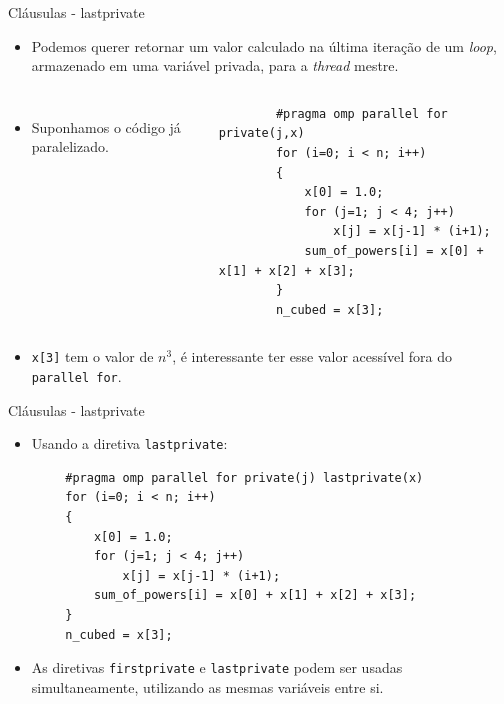 \begin{frame}[fragile]{Cláusulas - lastprivate}
	\begin{itemize}
		\item Podemos querer retornar um valor calculado na última iteração de um \textit{loop}, armazenado em uma variável privada, para a \textit{thread} mestre.
	\end{itemize}
	\begin{columns}
			\begin{itemize}
				\item Suponhamos o código já paralelizado.
			\end{itemize}
		\begin{verbatim}
		#pragma omp parallel for private(j,x)
		for (i=0; i < n; i++)
		{
			x[0] = 1.0;
			for (j=1; j < 4; j++)
				x[j] = x[j-1] * (i+1);
			sum_of_powers[i] = x[0] + x[1] + x[2] + x[3];
		}
		n_cubed = x[3];
		\end{verbatim}
	\end{columns}
	\begin{itemize}
		\item \texttt{x[3]} tem o valor de $n^3$, é interessante ter esse valor acessível fora do \texttt{parallel for}.
	\end{itemize}
\end{frame}

\begin{frame}[fragile]{Cláusulas - lastprivate}
	\begin{itemize}
		\item Usando a diretiva \texttt{lastprivate}:
	\end{itemize}
	\begin{verbatim}
		#pragma omp parallel for private(j) lastprivate(x)
		for (i=0; i < n; i++)
		{
			x[0] = 1.0;
			for (j=1; j < 4; j++)
				x[j] = x[j-1] * (i+1);
			sum_of_powers[i] = x[0] + x[1] + x[2] + x[3];
		}
		n_cubed = x[3];
	\end{verbatim}
	\begin{itemize}
		\item As diretivas \texttt{firstprivate} e \texttt{lastprivate} podem ser usadas simultaneamente, utilizando as mesmas variáveis entre si.
	\end{itemize}
\end{frame}

